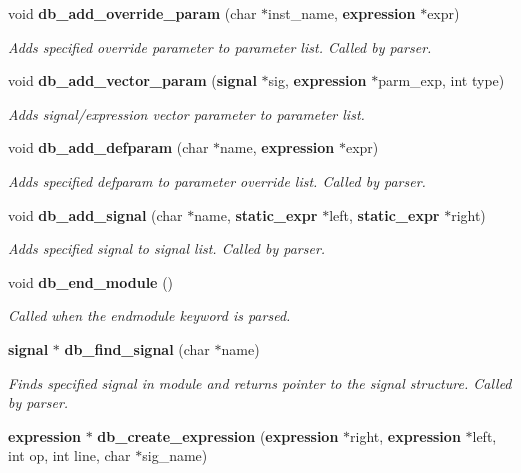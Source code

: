 \begin{CompactItemize}
void {\bf db\_\-add\_\-override\_\-param} (char $\ast$inst\_\-name, {\bf expression} $\ast$expr)
\begin{CompactList}\small\item\em Adds specified override parameter to parameter list. Called by parser.\item\end{CompactList}\item 
void {\bf db\_\-add\_\-vector\_\-param} ({\bf signal} $\ast$sig, {\bf expression} $\ast$parm\_\-exp, int type)
\begin{CompactList}\small\item\em Adds signal/expression vector parameter to parameter list.\item\end{CompactList}\item 
void {\bf db\_\-add\_\-defparam} (char $\ast$name, {\bf expression} $\ast$expr)
\begin{CompactList}\small\item\em Adds specified defparam to parameter override list. Called by parser.\item\end{CompactList}\item 
void {\bf db\_\-add\_\-signal} (char $\ast$name, {\bf static\_\-expr} $\ast$left, {\bf static\_\-expr} $\ast$right)
\begin{CompactList}\small\item\em Adds specified signal to signal list. Called by parser.\item\end{CompactList}\item 
void {\bf db\_\-end\_\-module} ()
\begin{CompactList}\small\item\em Called when the endmodule keyword is parsed.\item\end{CompactList}\item 
{\bf signal} $\ast$ {\bf db\_\-find\_\-signal} (char $\ast$name)
\begin{CompactList}\small\item\em Finds specified signal in module and returns pointer to the signal structure. Called by parser.\item\end{CompactList}\item 
{\bf expression} $\ast$ {\bf db\_\-create\_\-expression} ({\bf expression} $\ast$right, {\bf expression} $\ast$left, int op, int line, char $\ast$sig\_\-name)

\end{CompactItemize}
